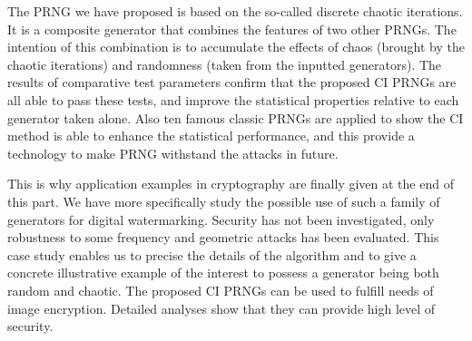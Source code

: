 The PRNG we have proposed is based on the so-called discrete chaotic iterations. It is a composite generator that combines the features of two other PRNGs.  The intention of this combination is to accumulate the effects of chaos (brought by the chaotic iterations) and randomness (taken from the inputted generators). The results of comparative test parameters confirm that the proposed CI PRNGs are all able to pass these tests, and improve the statistical properties relative to each generator taken alone. Also ten famous classic PRNGs are applied to show the CI method is able to enhance the statistical performance, and this provide a technology to make PRNG withstand the attacks in future.

This is why application examples in cryptography are finally given at the end of this part. We have more specifically study the possible use of such a family of generators for digital watermarking. Security has not been investigated, only robustness to some frequency and geometric attacks has been evaluated. This case study enables us to precise the details of the algorithm and to give a concrete illustrative example of the interest to possess a  generator being both random and chaotic. The proposed CI PRNGs can be used to fulfill needs of image encryption. Detailed analyses show that they can provide high level of security.

